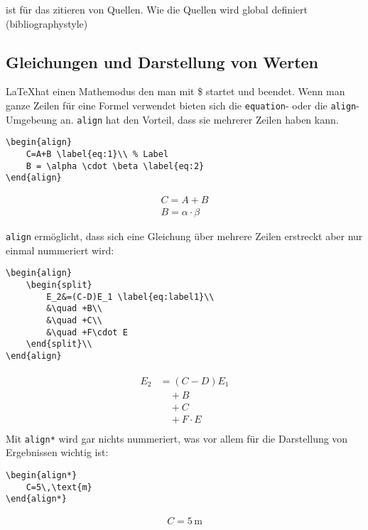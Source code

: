 \documentclass[twoside, 11pt, ngerman, a4paper, biblography=totoc]{article}
\begin{document}
\cite{beispiel1,beispiel2} ist für das zitieren von Quellen. Wie die Quellen wird global definiert (bibliographystyle) \\




\subsection{Gleichungen und Darstellung von Werten}
\LaTeX hat einen Mathemodus den man mit \$ startet und beendet. Wenn man ganze Zeilen für eine Formel verwendet bieten sich die \texttt{equation}- oder die \texttt{align}-Umgebeung an. \texttt{align} hat den Vorteil, dass sie mehrerer Zeilen haben kann.

\begin{lstlisting}
\begin{align}
	C=A+B \label{eq:1}\\ % Label
	B = \alpha \cdot \beta \label{eq:2}
\end{align}
\end{lstlisting}
\begin{align}
	C=A+B \label{eq:1}\\ %
	B = \alpha \cdot \beta \label{eq:2}
\end{align}

\texttt{align} ermöglicht, dass sich eine Gleichung über mehrere Zeilen erstreckt aber nur einmal nummeriert wird:

\begin{lstlisting}
\begin{align}
	\begin{split}
		E_2&=(C-D)E_1 \label{eq:label1}\\
		&\quad +B\\
		&\quad +C\\
		&\quad +F\cdot E
	\end{split}\\
\end{align}
\end{lstlisting}
\begin{align}
	\begin{split}
		E_2&=(C-D)E_1 \label{eq:label1}\\
		&\quad +B\\
		&\quad +C\\
		&\quad +F\cdot E
	\end{split}\\
\end{align}
Mit \texttt{align*} wird gar nichts nummeriert, was vor allem für die Darstellung von Ergebnissen wichtig ist:
\begin{lstlisting}
\begin{align*}
	C=5\,\text{m}
\end{align*}
\end{lstlisting}
\begin{align*}
	C=5\,\text{m}
\end{align*}
\end{document}
